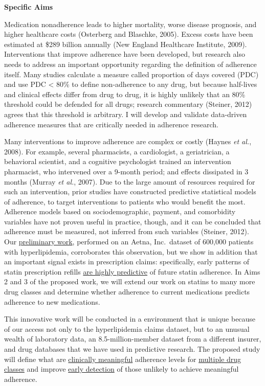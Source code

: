 \documentclass[11pt]{report}
\begin{document}
\textbf{Specific Aims}

Medication nonadherence leads to higher mortality, worse disease
prognosis, and higher healthcare costs (Osterberg and Blaschke, 2005).
Excess costs have been estimated at \$289 billion annually (New
England Healthcare Institute, 2009). Interventions that improve
adherence have been developed, but research also needs to address an
important opportunity regarding the definition of adherence itself.
Many studies calculate a measure called proportion of days covered
(PDC) and use PDC < 80\% to define non-adherence to any drug, but
because half-lives and clinical effects differ from drug to drug, it
is highly unlikely that an 80\% threshold could be defended for all
drugs; research commentary (Steiner, 2012) agrees that this threshold
is arbitrary. I will develop and validate data-driven adherence
measures that are critically needed in adherence research.

Many interventions to improve adherence are complex or costly (Haynes
\emph{et al.}, 2008). For example, several pharmacists, a
cardiologist, a geriatrician, a behavioral scientist, and a cognitive
psychologist trained an intervention pharmacist, who intervened over a
9-month period; and effects dissipated in 3 months (Murray \emph{et
  al.}, 2007). Due to the large amount of resources required for such
an intervention, prior studies have constructed predictive statistical
models of adherence, to target interventions to patients who would
benefit the most. Adherence models based on sociodemographic, payment,
and comorbidity variables have not proven useful in practice, though,
and it can be concluded that adherence must be measured, not inferred
from such variables (Steiner, 2012). Our \underline{preliminary work},
performed on an Aetna, Inc.\ dataset of 600,000 patients with
hyperlipidemia, corroborates this observation, but we show in addition
that an important signal exists in prescription claims: specifically,
early patterns of statin prescription refills \underline{are highly
  predictive} of future statin adherence. In Aims 2 and 3 of the
proposed work, we will extend our work on statins to many more drug
classes and determine whether adherence to current medications
predicts adherence to new medications.

This innovative work will be conducted in a environment that is unique
because of our access not only to the hyperlipidemia claims dataset,
but to an unusual wealth of laboratory data, an 8.5-million-member
dataset from a different insurer, and drug databases that we have used
in predictive research. The proposed study will define what are
\underline{clinically meaningful} adherence levels for
\underline{multiple drug classes} and improve \underline{early
  detection} of those unlikely to achieve meaningful adherence.
\end{document}
